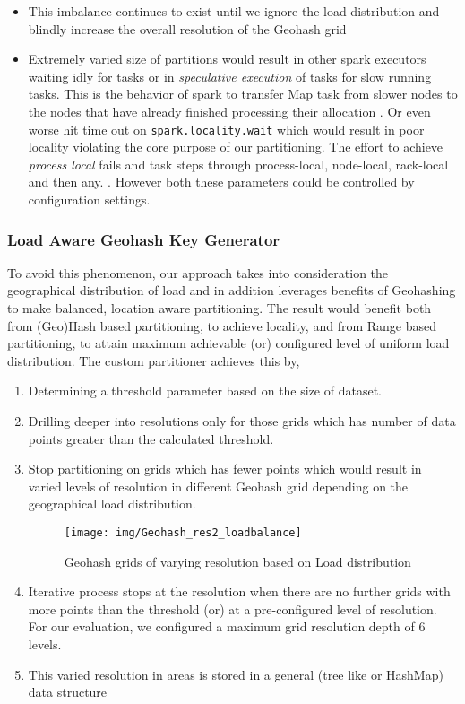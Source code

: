 \documentclass[article,type=msc,colorback,12pt,accentcolor=tud1d]{tudthesis}
\begin{document}
		\begin{itemize}
			\item This imbalance continues to exist until we ignore the load distribution and blindly increase the overall resolution of the Geohash grid
			\item Extremely varied size of partitions would result in other spark executors waiting idly for tasks or in \textit{speculative execution} of tasks for slow running tasks. This is the behavior of spark to  transfer Map task from slower nodes to the nodes that have already finished processing their allocation \cite{sparkspeculation}. Or even worse hit time out on \texttt{spark.locality.wait} which would result in poor locality violating the core purpose of our partitioning. The effort to achieve \textit{process local} fails and task steps through process-local, node-local, rack-local and then any. \cite{sparkconfiguration}. However both these parameters could be controlled by configuration settings.
		\end{itemize}

		
			\subsubsection{Load Aware Geohash Key Generator}
				\par To avoid this phenomenon, our approach takes into consideration the geographical distribution of load and in addition leverages benefits of Geohashing to make balanced, location aware partitioning. The result would benefit both from (Geo)Hash based partitioning, to achieve locality, and from Range based partitioning, to attain maximum achievable (or) configured level of uniform load distribution. The custom partitioner achieves this by,
				 \begin{enumerate}
				 	\item Determining a threshold parameter based on the size of dataset.
				 	\item Drilling deeper into resolutions only for those grids which has number of data points greater than the calculated threshold.
				 	\item Stop partitioning on grids which has fewer points which would result in varied levels of resolution in different Geohash grid depending on the geographical load distribution.
				 
				 \begin{figure}[h]
				 	\centering
				 	\texttt{[image: img/Geohash\_res2\_loadbalance]}
				 	\caption{Geohash grids of varying resolution based on Load distribution}
				 	\label{fig:Geohash_res2_loadbalance}
				 \end{figure}		
				 
				 	\item Iterative process stops at the resolution when there are no further grids with more points than the threshold (or) at a pre-configured level of resolution. For our evaluation, we configured a maximum grid resolution depth of 6 levels.
				 	\item This varied resolution in areas is stored in a general (tree like or HashMap) data structure
				 \end{enumerate}
									 
\end{document}
